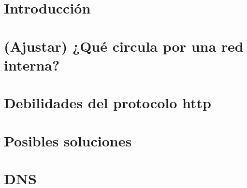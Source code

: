 \documentclass[12pt,twoside]{book}
\begin{document}
\nocite{*}

\frontmatter\pagestyle{empty}

\begin{titlepage}

\end{titlepage}

\begin{titlepage}

\end{titlepage}



\tableofcontents

\mainmatter\pagestyle{headings}


\chapter{Introducción}
    \label{capIntro}



\chapter{(Ajustar) ¿Qué circula por una red interna? } 
    \label{capImp}



\chapter{Debilidades del protocolo http} 
    \label{capDesc}



\chapter{Posibles soluciones}
    \label{capVirtu}


\chapter{DNS}
    \label{capDesaDns}




%


%
\end{document}
